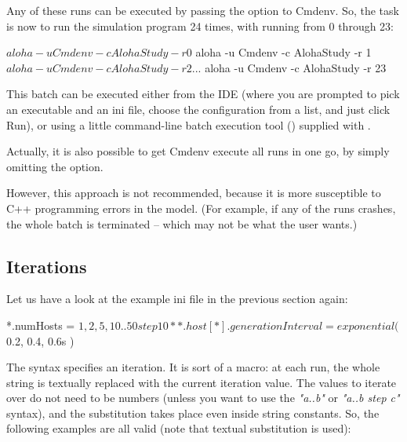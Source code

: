 Any of these runs can be executed by passing the 
option to Cmdenv. So, the task is now to run the simulation program 24
times, with  running from 0 through 23:

\begin{commandline}
$ aloha -u Cmdenv -c AlohaStudy -r 0
$ aloha -u Cmdenv -c AlohaStudy -r 1
$ aloha -u Cmdenv -c AlohaStudy -r 2
...
$ aloha -u Cmdenv -c AlohaStudy -r 23
\end{commandline}

This batch can be executed either from the {\opp} IDE (where you are
prompted to pick an executable and an ini file, choose the configuration
from a list, and just click Run), or using a little command-line
batch execution tool () supplied with {\opp}.

Actually, it is also possible to get Cmdenv execute all runs in one go,
by simply omitting the  option.



However, this approach is not recommended, because it is more
susceptible to C++ programming errors in the model. (For example, if
any of the runs crashes, the whole batch is terminated -- which may
not be what the user wants.)


\subsection{Iterations}

Let us have a look at the example ini file in the previous section again:

\begin{inifile}
*.numHosts = ${1, 2, 5, 10..50 step 10}
**.host[*].generationInterval = exponential( ${0.2, 0.4, 0.6}s )
\end{inifile}

The  syntax specifies an iteration. It is sort of a macro: at
each run, the whole  string is textually replaced with the
current iteration value. The values to iterate over do not need to be
numbers (unless you want to use the \textit{"a..b"} or
\textit{"a..b step c"} syntax), and the
substitution takes place even inside string constants. So, the
following examples are all valid (note that textual substitution is
used):

